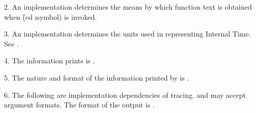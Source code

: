 \item{2.} An implementation determines the means by which
function text is obtained when \f{(ed \i{symbol})} is invoked.

\item{3.} An implementation determines the units used in representing
Internal Time.
See .

\item{4.} The information  prints is
.  
\item{5.} The nature and
format of the information printed by  
is .  
           
\item{6.} The following are implementation dependencies of
tracing.
\beginlist
{}  and  may accept 
 argument formats.  
 The format of the 
output is .
\endlist        
\endlist        
\endsubSection%

